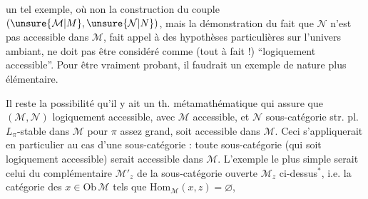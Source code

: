 un tel exemple, où  non la construction du couple $(\unsure{\mathcal M|M},\unsure{\mathcal N|N})$, mais la démonstration du fait que $\mathcal N$ n'est pas accessible dans $\mathcal M$, fait appel à des hypothèses particulières
sur l'univers ambiant, ne doit pas être considéré comme (tout à fait !) ``logiquement accessible''. Pour être vraiment probant, il faudrait un exemple de nature plus élémentaire.

Il reste la possibilité qu'il y ait un th. métamathématique qui assure que   $(\mathcal M,\mathcal N)$ logiquement accessible, avec
$\mathcal M$ accessible, et $\mathcal N$ sous-catégorie str. pl. $L_\pi$-stable dans $\mathcal M$ pour $\pi$ assez grand, soit accessible dans $\mathcal M$. Ceci s'appliquerait en particulier au cas d'une sous-catégorie \uline{} : toute sous-catégorie   (qui soit logiquement accessible) serait accessible dans $\mathcal M$.
L'exemple le plus simple serait celui du complémentaire  $\mathcal M'_z$ de la sous-catégorie ouverte $\mathcal M_z$ ci-dessus$^{*}$, i.e. la catégorie des
$x\in\mathrm{Ob}\,\mathcal M$ tels que $\mathrm{Hom}_{\mathcal M}(x,z)=\varnothing$,  

